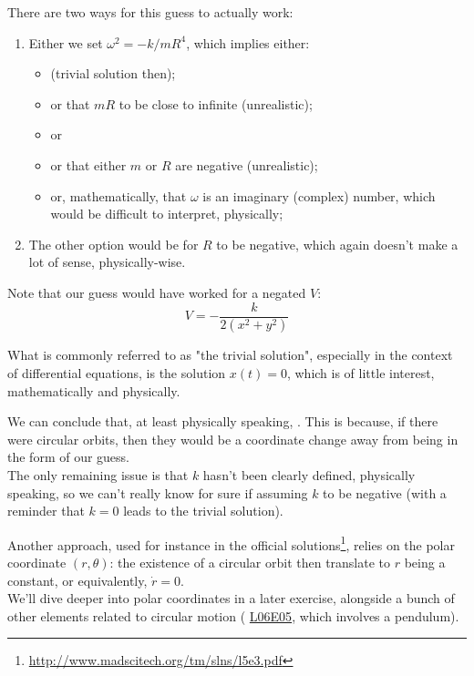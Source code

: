 \documentclass[solutions.tex]{subfiles}
\begin{document}
There are two ways for this guess to actually work:
\begin{enumerate}
	\item Either we set $\omega^2=-k/mR^4$, which implies either:
	\begin{itemize}
		\item {} (trivial solution then);
		\item or that $mR$ to be close to infinite (unrealistic);
		\item or 
		\item or that either $m$ or $R$ are negative (unrealistic);
		\item or, mathematically, that $\omega$ is an imaginary
		(complex) number, which would be difficult to interpret,
		physically;
	\end{itemize}
	\item The other option would be for $R$ to be negative, which again
	doesn't make a lot of sense, physically-wise.
\end{enumerate}
\begin{remark} Note that our guess would have worked for a negated $V$:
\[
	V=-\frac{k}{2(x^2+y^2)}
\]
\end{remark}
\begin{remark} What is commonly referred to as "the trivial solution", especially
in the context of differential equations, is the solution $x(t)=0$, which is
of little interest, mathematically and physically.
\end{remark}

We can conclude that, at least physically speaking,
.
This is because, if there were circular orbits, then they would be a
coordinate change away from being in the form of our guess. \\

The only remaining issue is that $k$ hasn't been clearly defined,
physically speaking, so we can't really know for sure if assuming
$k$ to be negative (with a reminder that $k=0$ leads to the trivial
solution).

\begin{remark} Another approach, used for instance in the official
solutions\footnote{\url{http://www.madscitech.org/tm/slns/l5e3.pdf}},
relies on the polar coordinate $(r,\theta)$: the existence of a circular
orbit then translate to $r$ being a constant, or equivalently, $\dot{r}=0$. \\

We'll dive deeper into polar coordinates in a later exercise, alongside
a bunch of other elements related to circular motion (
\href{https://github.com/mbivert/ttm/blob/master/cm/L06E05.pdf}{L06E05},
which involves a pendulum).
\end{remark}
\end{document}
